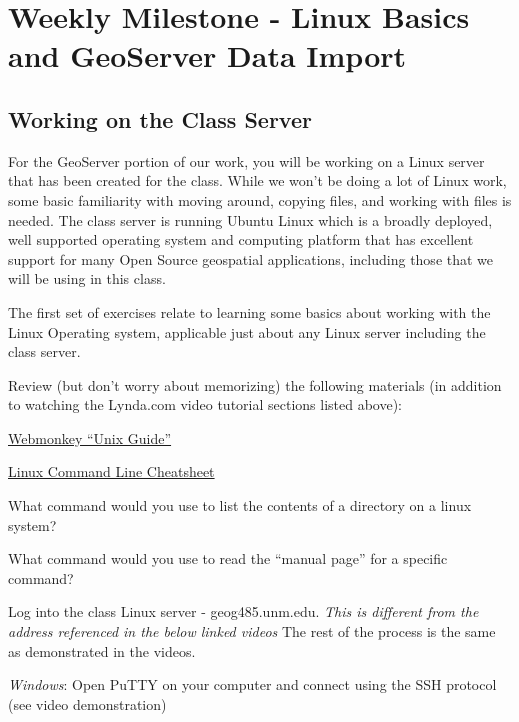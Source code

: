 \documentclass[]{book}
\providecommand{\tightlist}{%
  \setlength{\itemsep}{0pt}\setlength{\parskip}{0pt}}
\begin{document}
\section{Weekly Milestone - Linux Basics and GeoServer Data
Import}\label{week13-milestone}

\subsection{Working on the Class
Server}\label{working-on-the-class-server}

For the GeoServer portion of our work, you will be working on a Linux
server that has been created for the class. While we won't be doing a
lot of Linux work, some basic familiarity with moving around, copying
files, and working with files is needed. The class server is running
Ubuntu Linux which is a broadly deployed, well supported operating
system and computing platform that has excellent support for many Open
Source geospatial applications, including those that we will be using in
this class.

The first set of exercises relate to learning some basics about working
with the Linux Operating system, applicable just about any Linux server
including the class server.

Review (but don't worry about memorizing) the following materials (in
addition to watching the Lynda.com video tutorial sections listed
above):

\href{http://www.webmonkey.com/2010/02/unix-guide/}{Webmonkey ``Unix
Guide''}

\href{http://www.cheatography.com/davechild/cheat-sheets/linux-command-line/}{Linux
Command Line Cheatsheet}

\begin{description}
\tightlist
\item[QUESTION 1]
What command would you use to list the contents of a directory on a
linux system?
\item[QUESTION 2]
What command would you use to read the ``manual page'' for a specific
command?
\end{description}

Log into the class Linux server - geog485.unm.edu. \emph{This is
different from the address referenced in the below linked videos} The
rest of the process is the same as demonstrated in the videos.

\emph{Windows}: Open PuTTY on your computer and connect using the SSH
protocol (see video demonstration)
\end{document}
